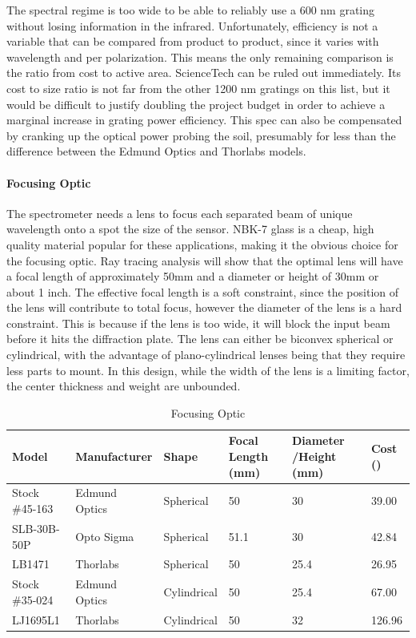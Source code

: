 The spectral regime is too wide to be able to reliably use a 600 nm grating without losing information in the infrared. Unfortunately, efficiency is not a variable that can be compared from product to product, since it varies with wavelength and per polarization. This means the only remaining comparison is the ratio from cost to active area. ScienceTech can be ruled out immediately. Its cost to size ratio is not far from the other 1200 nm gratings on this list, but it would be difficult to justify doubling the project budget in order to achieve a marginal increase in grating power efficiency. This spec can also be compensated by cranking up the optical power probing the soil, presumably for less than the  difference between the Edmund Optics and Thorlabs models.


\paragraph{Focusing Optic}
The spectrometer needs a lens to focus each separated beam of unique wavelength onto a spot the size of the sensor. NBK-7 glass is a cheap, high quality material popular for these applications, making it the obvious choice for the focusing optic. Ray tracing analysis will show that the optimal lens will have a focal length of approximately 50mm and a diameter or height of 30mm or about 1 inch. The effective focal length is a soft constraint, since the position of the lens will contribute to total focus, however the diameter of the lens is a hard constraint. This is because if the lens is too wide, it will block the input beam before it hits the diffraction plate. The lens can either be biconvex spherical or cylindrical, with the advantage of plano-cylindrical lenses being that they require less parts to mount. In this design, while the width of the lens is a limiting factor, the center thickness and weight are unbounded.

\begin{table}[H]
	\centering
	\label{table:Focusing Optic}
	\caption{Focusing Optic}
	\bigskip
	\begin{tabular}{|p{3cm}|p{2.5cm}|p{2cm}|p{1.5cm}|p{1.75cm}|p{1.25cm}|}
	\hline
	Model & Manufacturer & Shape & Focal Length (mm) & Diameter /Height (mm) & Cost (\textdollar)\\
	\hline
	Stock \#45-163 & Edmund Optics & Spherical & 50 & 30 & 39.00\\
	\hline
	SLB-30B-50P & Opto Sigma & Spherical & 51.1 & 30 & 42.84\\
	\hline
	LB1471 & Thorlabs & Spherical & 50 & 25.4 & 26.95\\
	\hline
	Stock \#35-024 & Edmund Optics & Cylindrical & 50 & 25.4 & 67.00\\
	\hline
	LJ1695L1 & Thorlabs & Cylindrical & 50 & 32 & 126.96\\
	\hline
	\end{tabular}
\end{table}

